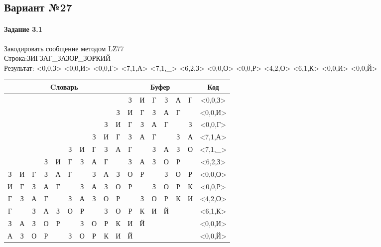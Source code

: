 \documentclass[a4paper, 12pt]{article}
\begin{document}
\pagebreak
\subsection{Вариант №27}
\paragraph{Задание 3.1}

Закодировать сообщение методом LZ77\\
Строка:ЗИГЗАГ\_ЗАЗОР\_ЗОРКИЙ\\
Результат: <0,0,З> <0,0,И> <0,0,Г> <7,1,А> <7,1,\_> <6,2,З> <0,0,О> <0,0,Р> <4,2,О> <6,1,К> <0,0,И> <0,0,Й>\\
\begin{table}[h!]
\centering
\begin{tabular}{|c|c|c|c|c|c|c|c|c|c|c|c|c|c|c|c|c|} 
\hline
\multicolumn{10}{|c|}{Cловарь} & \multicolumn{6}{c|}{Буфер} & Код  \\ \hline
  &   &   &   &   &   &   &   &   &   & \cellcolor[HTML]{8CE4F6} З & И & Г & З & А & Г & <0,0,З>
\\ \hline
  &   &   &   &   &   &   &   &   & З & \cellcolor[HTML]{8CE4F6} И & Г & З & А & Г &   & <0,0,И>
\\ \hline
  &   &   &   &   &   &   &   & З & И & \cellcolor[HTML]{8CE4F6} Г & З & А & Г &   & З & <0,0,Г>
\\ \hline
  &   &   &   &   &   &   & \cellcolor[HTML]{FFFF00} З & И & Г & \cellcolor[HTML]{FFFF00} З & \cellcolor[HTML]{8CE4F6} А & Г &   & З & А & <7,1,А>
\\ \hline
  &   &   &   &   & З & И & \cellcolor[HTML]{FFFF00} Г & З & А & \cellcolor[HTML]{FFFF00} Г & \cellcolor[HTML]{8CE4F6}   & З & А & З & О & <7,1,\_>
\\ \hline
  &   &   & З & И & Г & \cellcolor[HTML]{FFFF00} З & \cellcolor[HTML]{FFFF00} А & Г &   & \cellcolor[HTML]{FFFF00} З & \cellcolor[HTML]{FFFF00} А & \cellcolor[HTML]{8CE4F6} З & О & Р &   & <6,2,З>
\\ \hline
З & И & Г & З & А & Г &   & З & А & З & \cellcolor[HTML]{8CE4F6} О & Р &   & З & О & Р & <0,0,О>
\\ \hline
И & Г & З & А & Г &   & З & А & З & О & \cellcolor[HTML]{8CE4F6} Р &   & З & О & Р & К & <0,0,Р>
\\ \hline
Г & З & А & Г & \cellcolor[HTML]{FFFF00}   & \cellcolor[HTML]{FFFF00} З & А & З & О & Р & \cellcolor[HTML]{FFFF00}   & \cellcolor[HTML]{FFFF00} З & \cellcolor[HTML]{8CE4F6} О & Р & К & И & <4,2,О>
\\ \hline
Г &   & З & А & З & О & \cellcolor[HTML]{FFFF00} Р &   & З & О & \cellcolor[HTML]{FFFF00} Р & \cellcolor[HTML]{8CE4F6} К & И & Й &   &   & <6,1,К>
\\ \hline
З & А & З & О & Р &   & З & О & Р & К & \cellcolor[HTML]{8CE4F6} И & Й &   &   &   &   & <0,0,И>
\\ \hline
А & З & О & Р &   & З & О & Р & К & И & \cellcolor[HTML]{8CE4F6} Й &   &   &   &   &   & <0,0,Й>
\\ \hline
\end{tabular}
\end{table}
\end{document}
